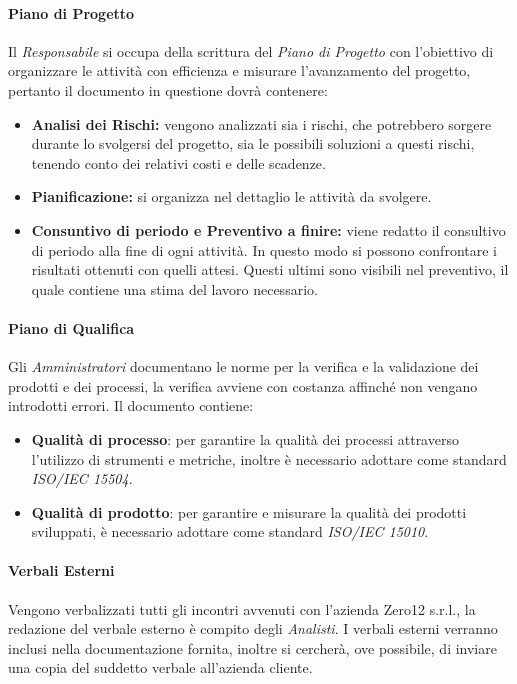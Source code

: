 \paragraph{Piano di Progetto}
Il \textit{Responsabile} si occupa della scrittura del \textit{Piano di Progetto} con l'obiettivo di organizzare le attività con efficienza e misurare l'avanzamento del progetto, pertanto il documento in questione dovrà contenere:
\begin{itemize}
	\item \textbf{Analisi dei Rischi:} vengono analizzati sia i rischi, che potrebbero sorgere durante lo svolgersi del progetto, sia le possibili soluzioni a questi rischi, tenendo conto dei relativi costi e delle scadenze.
	\item \textbf{Pianificazione:} si organizza nel dettaglio le attività da svolgere.
	\item \textbf{Consuntivo di periodo e Preventivo a finire:} viene redatto il consultivo di periodo alla fine di ogni attività. In questo modo si possono confrontare i risultati ottenuti con quelli attesi. Questi ultimi sono visibili nel preventivo, il quale contiene una stima del lavoro necessario.
\end{itemize}

\paragraph{Piano di Qualifica}
Gli \textit{Amministratori} documentano le norme per la verifica e la validazione dei prodotti e dei processi, la verifica avviene con costanza affinché non vengano introdotti errori. Il documento contiene:
\begin{itemize}
	\item \textbf{Qualità di processo}: per garantire la qualità dei processi attraverso l'utilizzo di strumenti e metriche, inoltre è necessario adottare come standard \textit{ISO/IEC 15504}.
	\item \textbf{Qualità di prodotto}: per garantire e misurare la qualità dei prodotti sviluppati, è necessario adottare come standard \textit{ISO/IEC 15010}.
\end{itemize}

\paragraph{Verbali Esterni}
Vengono verbalizzati tutti gli incontri avvenuti con l'azienda Zero12 s.r.l., la redazione del verbale esterno è compito degli \textit{Analisti}. I verbali esterni verranno inclusi nella documentazione fornita, inoltre si cercherà, ove possibile, di inviare una copia del suddetto verbale all'azienda cliente.

